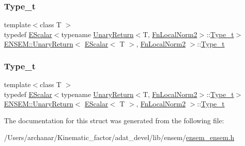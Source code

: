 \subsubsection{\texorpdfstring{Type\_t}{Type\_t}\hspace{0.1cm}{\footnotesize\ttfamily [1/2]}}
{\footnotesize\ttfamily template$<$class T $>$ \\
typedef \mbox{\hyperlink{classENSEM_1_1EScalar}{E\+Scalar}}$<$typename \mbox{\hyperlink{structENSEM_1_1UnaryReturn}{Unary\+Return}}$<$T, \mbox{\hyperlink{structENSEM_1_1FnLocalNorm2}{Fn\+Local\+Norm2}}$>$\+::\mbox{\hyperlink{structENSEM_1_1UnaryReturn_3_01EScalar_3_01T_01_4_00_01FnLocalNorm2_01_4_ab80faba745e53e04277e860e474c3e19}{Type\+\_\+t}}$>$ \mbox{\hyperlink{structENSEM_1_1UnaryReturn}{E\+N\+S\+E\+M\+::\+Unary\+Return}}$<$ \mbox{\hyperlink{classENSEM_1_1EScalar}{E\+Scalar}}$<$ T $>$, \mbox{\hyperlink{structENSEM_1_1FnLocalNorm2}{Fn\+Local\+Norm2}} $>$\+::\mbox{\hyperlink{structENSEM_1_1UnaryReturn_3_01EScalar_3_01T_01_4_00_01FnLocalNorm2_01_4_ab80faba745e53e04277e860e474c3e19}{Type\+\_\+t}}}

\mbox{\label{structENSEM_1_1UnaryReturn_3_01EScalar_3_01T_01_4_00_01FnLocalNorm2_01_4_ab80faba745e53e04277e860e474c3e19}} 
\subsubsection{\texorpdfstring{Type\_t}{Type\_t}\hspace{0.1cm}{\footnotesize\ttfamily [2/2]}}
{\footnotesize\ttfamily template$<$class T $>$ \\
typedef \mbox{\hyperlink{classENSEM_1_1EScalar}{E\+Scalar}}$<$typename \mbox{\hyperlink{structENSEM_1_1UnaryReturn}{Unary\+Return}}$<$T, \mbox{\hyperlink{structENSEM_1_1FnLocalNorm2}{Fn\+Local\+Norm2}}$>$\+::\mbox{\hyperlink{structENSEM_1_1UnaryReturn_3_01EScalar_3_01T_01_4_00_01FnLocalNorm2_01_4_ab80faba745e53e04277e860e474c3e19}{Type\+\_\+t}}$>$ \mbox{\hyperlink{structENSEM_1_1UnaryReturn}{E\+N\+S\+E\+M\+::\+Unary\+Return}}$<$ \mbox{\hyperlink{classENSEM_1_1EScalar}{E\+Scalar}}$<$ T $>$, \mbox{\hyperlink{structENSEM_1_1FnLocalNorm2}{Fn\+Local\+Norm2}} $>$\+::\mbox{\hyperlink{structENSEM_1_1UnaryReturn_3_01EScalar_3_01T_01_4_00_01FnLocalNorm2_01_4_ab80faba745e53e04277e860e474c3e19}{Type\+\_\+t}}}



The documentation for this struct was generated from the following file\+:\begin{DoxyCompactItemize}
\item 
/\+Users/archanar/\+Kinematic\+\_\+factor/adat\+\_\+devel/lib/ensem/\mbox{\hyperlink{lib_2ensem_2ensem__ensem_8h}{ensem\+\_\+ensem.\+h}}\end{DoxyCompactItemize}
